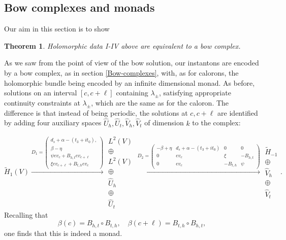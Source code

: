 \documentclass[12pt]{article}
\newtheorem{theorem}{Theorem}[section]
\theoremstyle{definition}
\theoremstyle{remark}
\numberwithin{theorem}{section}
\begin{document}
\subsection{Bow complexes and monads}\label{mpos}

Our aim in this section is to show
\begin{theorem} Holomorphic data I-IV above are equivalent to a bow complex.
\end{theorem}

As we saw from the point of view of the bow solution, our instantons are encoded  by a bow complex, as in section \ref{Bow-complexes}, with, as for calorons, the holomorphic bundle being encoded by an infinite dimensional monad. As before, solutions on an interval $[c, c+\ell]$ containing $\lambda_\pm$,  satisfying appropriate continuity constraints at $\lambda_\pm$, which are the same as for the caloron. The difference is that instead of being periodic, the solutions at $c, c+\ell$ are identified by adding four auxiliary spaces $\widehat U_h,\widehat  U_t, \widehat V_h, \widehat  V_t$ of dimension $k$ to the complex:

\begin{equation} \label{infmonad}
 \widetilde{H}_{1}(V)  \xrightarrow{D_1 = \left(\begin{smallmatrix}  d_s + \alpha -(t_3+it_0), \\  \beta-\eta\\ \psi ev_{c}+ B_{h,t} ev_{c+\ell}\\ \xi ev_{c+\ell}+B_{t,h} ev_{c} \end{smallmatrix}\right)}\begin{matrix} L^2(V)\\ \oplus \\ L^2(V) \\ \oplus\\ \widehat U_h\\ \oplus \\ \widehat  U_t\end{matrix}\xrightarrow{D_2 = \left(\begin{smallmatrix}  -\beta+ \eta &d_s + \alpha -(t_3+it_0)&0&0\\0&ev_c&\xi&  -B_{h,t}\\0&ev_c& - B_{t,h}&\psi \end{smallmatrix}\right)} \begin{matrix}\widetilde{H}_{-1}\\ \oplus\\  \widehat V_h\\ \oplus \\ \widehat  V_t \end{matrix}.  \end{equation}
Recalling that 
$$\beta(c) = B_{h,t}\circ B_{t,h},\quad \beta(c+\ell) = B_{t,h}\circ B_{h,t},$$
one finds that this is indeed a monad.
\end{document}
